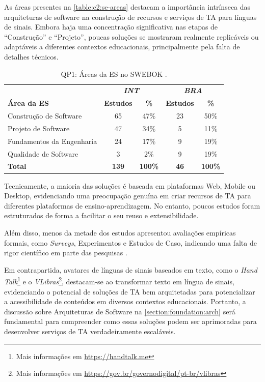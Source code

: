 As áreas presentes na \autoref{table:c2:se-areas} destacam a importância intrínseca das arquiteturas de software na construção de recursos e serviços de TA para línguas de sinais. Embora haja uma concentração significativa nas etapas de ``Construção'' e ``Projeto'', poucas soluções se mostraram realmente replicáveis ou adaptáveis a diferentes contextos educacionais, principalmente pela falta de detalhes técnicos.

\begin{table}[htb]
\caption{QP1: Áreas da ES no SWEBOK \cite{Bourque2014}.}
\label{table:c2:se-areas}
\centering
\begin{tabular}{l|cc|cc} \hline
 & \multicolumn{2}{c|}{\textit{\textbf{INT}}} & \multicolumn{2}{c}{\textit{\textbf{BRA}}} \\ \cline{2-5} 
\textbf{Área da ES} & \textbf{Estudos} & \textbf{\%} & \textbf{Estudos} & \textbf{\%} \\ \hline
Construção de Software & 65 & 47\% & 23 & 50\% \\
Projeto de Software & 47 & 34\% & 5 & 11\% \\
Fundamentos da Engenharia & 24 & 17\% & 9 & 19\% \\
Qualidade de Software & 3 & 2\% & 9 & 19\% \\ \hline
\textbf{Total} & \textbf{139} & \textbf{100\%} & \textbf{46} & \textbf{100\%} \\ \hline
\end{tabular}
\end{table}

Tecnicamente, a maioria das soluções é baseada em plataformas Web, Mobile ou Desktop, evidenciando uma preocupação genuína em criar recursos de TA para diferentes plataformas de ensino-aprendizagem. No entanto, poucos estudos foram estruturados de forma a facilitar o seu reuso e extensibilidade. 

Além disso, menos da metade dos estudos apresentou avaliações empíricas formais, como \textit{Surveys}, Experimentos e Estudos de Caso, indicando uma falta de rigor científico em parte das pesquisas \cite{Pressman2016, Sommerville2015}.

Em contrapartida, avatares de línguas de sinais baseados em texto, como o \textit{Hand Talk}\footnote{Mais informações em \url{https://handtalk.me}} e o \textit{VLibras}\footnote{Mais informações em \url{https://gov.br/governodigital/pt-br/vlibras}}, destacam-se ao transformar texto em língua de sinais, evidenciando o potencial de soluções de TA bem arquitetadas para potencializar a acessibilidade de conteúdos em diversos contextos educacionais. Portanto, a discussão sobre Arquiteturas de Software na \autoref{section:foundation:arch} será fundamental para compreender como essas soluções podem ser aprimoradas para desenvolver serviços de TA verdadeiramente escaláveis.

